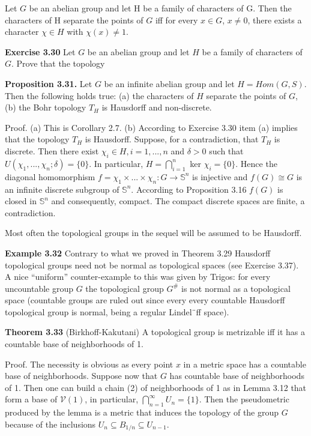 \documentclass[12pt]{article}
\begin{document}
            Let $G$ be an abelian group and let H be a family of characters of G. Then the characters of H separate the
        points of $G$ iff for every $x \in G$, $x \neq 0$, there exists a character $\chi \in H$ with $\chi(x) \neq 1$.


    \textbf{Exercise 3.30} Let $G$ be an abelian group and let $H$ be a family of characters of $G$. Prove that the topology



    \textbf{Proposition 3.31.} Let $G$ be an infinite abelian group and let $H = Hom(G,S)$. Then the following holds true:
    (a) the characters of $H$ separate the points of $G$,
    (b) the Bohr topology $T_H$ is Hausdorff and non-discrete. 
    
    Proof.
    (a) This is Corollary 2.7.
    (b) According to Exercise 3.30 item (a) implies
    that the topology $T_H$ is Hausdorff. Suppose, for a contradiction, that $T_H$ is discrete. Then there exist $\chi_i \in H, i = 1, . . . , n$ and
    $\delta > 0$ such that $U(\chi_1, . . . , \chi_n; \delta) = \{0\}$. In particular, $H = \bigcap^n_{i=1}$ ker $\chi_i = \{0\}$. Hence the diagonal homomorphism
    $f = \chi_1 \times . . . \times  \chi_n : G \to  \mathbb{S}^n$ is injective and $f(G) \cong G$ is an infinite discrete subgroup of $\mathbb{S}^n$. According to
    Proposition 3.16 $f(G)$ is closed in $\mathbb{S}^n$ and consequently, compact. The compact discrete spaces are finite, a contradiction.


    Most often the topological groups in the sequel will be assumed to be Hausdorff.


    \textbf{Example 3.32} Contrary to what we proved in Theorem 3.29 Hausdorff topological groups need not be normal
    as topological spaces (see Exercise 3.37). A nice “uniform” counter-example to this was given by Trigos: for
    every uncountable group $G$ the topological group $G^{\#}$ is not normal as a topological space (countable groups are
    ruled out since every every countable Hausdorff topological group is normal, being a regular Lindel¨ff space).
    

    \textbf{Theorem 3.33} (Birkhoff-Kakutani) A topological group is metrizable iff it has a countable base of
    neighborhoods of 1.


            Proof. The necessity is obvious as every point $x$ in a metric space has a countable base of neighborhoods. Suppose
        now that $G$ has countable base of neighborhoods of 1. Then one can build a chain (2) of neighborhoods of 1 as
        in Lemma 3.12 that form a base of $\mathcal{V}(1)$, in particular, $\bigcap^{\infty}_{n=1} U_n = \{1\}$. Then the pseudometric produced by the
        lemma is a metric that induces the topology of the group $G$ because of the inclusions $U_n \subseteq B_{1/n} \subseteq U_{n-1}$.
\end{document}
